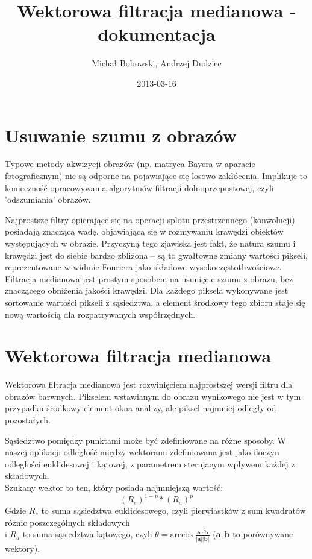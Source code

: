 \documentclass[a4paper,12pt,oneside,notitlepage,onecolumn]{article}
\author{Michał Bobowski, Andrzej Dudziec}
\date{2013-03-16}
\title{Wektorowa filtracja medianowa - dokumentacja}
\begin{document}
  \maketitle
\section{Usuwanie szumu z obrazów}
Typowe metody akwizycji obrazów (np. matryca Bayera w aparacie fotograficznym) nie są odporne na pojawiające się losowo zakłócenia.
Implikuje to konieczność opracowywania algorytmów filtracji dolnoprzepustowej, czyli 'odszumiania' obrazów.

Najprostsze filtry opierające się na operacji splotu przestrzennego (konwolucji) posiadają znaczącą wadę, objawiającą się w rozmywaniu krawędzi obiektów występujących w obrazie.
Przyczyną tego zjawiska jest fakt, że natura szumu i krawędzi jest do siebie bardzo zbliżona – są to gwałtowne zmiany wartości pikseli, reprezentowane w widmie Fouriera jako składowe wysokoczęstotliwościowe.
Filtracja medianowa jest prostym sposobem na usunięcie szumu z obrazu, bez znaczącego obniżenia jakości krawędzi.
Dla każdego piksela wykonywane jest sortowanie wartości pikseli z sąsiedztwa, a element środkowy tego zbioru staje się nową wartością dla rozpatrywanych współrzędnych.

\section{Wektorowa filtracja medianowa}
Wektorowa filtracja medianowa jest rozwinięciem najprostszej wersji filtru dla obrazów barwnych.
Pikselem wstawianym do obrazu wynikowego nie jest w tym przypadku środkowy element okna analizy, ale piksel najmniej odległy od pozostałych.

Sąsiedztwo pomiędzy punktami może być zdefiniowane na różne sposoby. 
W naszej aplikacji odległość między wektorami zdefiniowana jest jako iloczyn odległości euklidesowej i kątowej, z parametrem sterujacym wpływem każdej z składowych.\\
Szukany wektor to ten, który posiada najmniejszą wartość:\\
$$(R_{e})^{1-p} * (R_{a})^p$$
Gdzie $R_{e}$ to suma sąsiedztwa euklidesowego, czyli pierwiastków z sum kwadratów różnic poszczególnych składowych\\
i $R_{a}$ to suma sąsiedztwa kątowego, czyli $\theta = \mathrm{arccos}\; \frac{\mathbf a \cdot \mathbf b}{|\mathbf a| |\mathbf b|}$ ($\mathbf a , \mathbf b$ to porównywane wektory).
\end{document}
